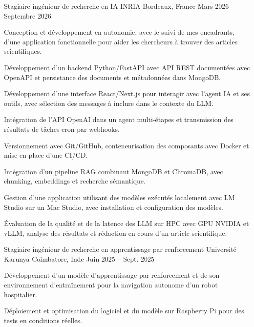 
\begin{cventries}
  \cventry
    {Stagiaire ingénieur de recherche en IA}
    {INRIA}
    {Bordeaux, France}
    {Mars 2026 -- Septembre 2026}
    {
      \begin{cvitems}
        \item {Conception et développement en autonomie, avec le suivi de mes encadrants, d’une application fonctionnelle pour aider les chercheurs à trouver des articles scientifiques.}
        \item {Développement d’un backend Python/FastAPI avec API REST documentées avec OpenAPI et persistance des documents et métadonnées dans MongoDB.}
        \item {Développement d’une interface React/Next.js pour interagir avec l’agent IA et ses outils, avec sélection des messages à inclure dans le contexte du LLM.}
        \item {Intégration de l’API OpenAI dans un agent multi-étapes et transmission des résultats de tâches cron par webhooks.}
        \item {Versionnement avec Git/GitHub, conteneurisation des composants avec Docker et mise en place d’une CI/CD.}
        \item {Intégration d’un pipeline RAG combinant MongoDB et ChromaDB, avec chunking, embeddings et recherche sémantique.}
        \item {Gestion d’une application utilisant des modèles exécutés localement avec LM Studio sur un Mac Studio, avec installation et configuration des modèles.}
        \item {Évaluation de la qualité et de la latence des LLM sur HPC avec GPU NVIDIA et vLLM, analyse des résultats et rédaction en cours d’un article scientifique.}
      \end{cvitems}
    }

  \cventry
    {Stagiaire ingénieur de recherche en apprentissage par renforcement}
    {Université Karunya}
    {Coimbatore, Inde}
    {Juin 2025 -- Sept. 2025}
    {
      \begin{cvitems}
        \item {Développement d’un modèle d’apprentissage par renforcement et de son environnement d’entraînement pour la navigation autonome d’un robot hospitalier.}
        \item {Déploiement et optimisation du logiciel et du modèle sur Raspberry Pi pour des tests en conditions réelles.}
      \end{cvitems}
    }
\end{cventries}
